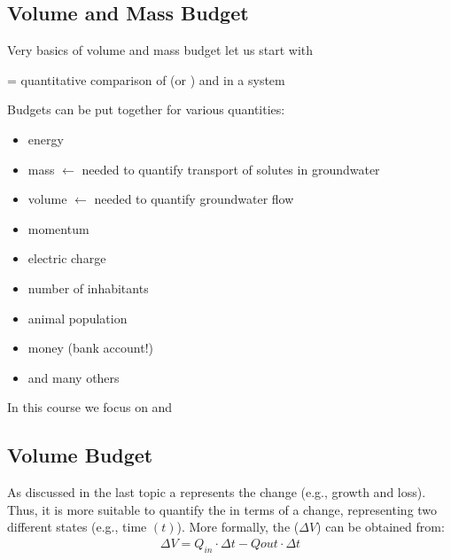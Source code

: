 \documentclass[letterpaper,10pt,english]{sphinxmanual}
\begin{document}
\subsection{Volume and Mass Budget}
\label{\detokenize{contents/background/03_basic_hydrogeology:volume-and-mass-budget}}
Very basics of volume and mass budget \sphinxhyphen{} let us start with 

 = quantitative comparison of  (or ) and  in a system

Budgets can be put together for various quantities:
\begin{itemize}
\item {} 
energy

\item {} 
mass \(\leftarrow\) needed to quantify transport of solutes in groundwater

\item {} 
volume \(\leftarrow\)  needed to quantify groundwater flow

\item {} 
momentum

\item {} 
electric charge

\item {} 
number of inhabitants

\item {} 
animal population

\item {} 
money (bank account!)

\item {} 
and many others

\end{itemize}

In this course we focus on  and 


\subsection{Volume Budget}
\label{\detokenize{contents/background/03_basic_hydrogeology:volume-budget}}
As discussed in the last topic a  represents the change (e.g., growth and loss). Thus, it is more suitable to quantify the  in terms of a change, representing two different states (e.g., time \((t)\)). More formally, the  (\(\Delta V\)) can be obtained from:
\begin{equation*}
\begin{split}
\Delta V = Q_{in} \cdot \Delta t - Q{out} \cdot \Delta t 
\end{split}
\end{equation*}
\end{document}

